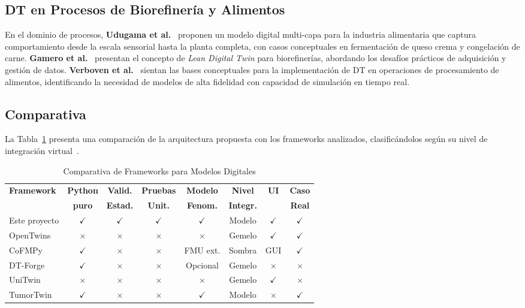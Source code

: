 \documentclass[10pt,letterpaper,twocolumn]{article}
\begin{document}
\subsection{DT en Procesos de Biorefinería y Alimentos}

En el dominio de procesos, \textbf{Udugama et al.}~\cite{udugama2023digital} proponen un modelo digital multi-capa para la industria alimentaria que captura comportamiento desde la escala sensorial hasta la planta completa, con casos conceptuales en fermentación de queso crema y congelación de carne. \textbf{Gamero et al.}~\cite{gamero2024data} presentan el concepto de \textit{Lean Digital Twin} para biorefinerías, abordando los desafíos prácticos de adquisición y gestión de datos. \textbf{Verboven et al.}~\cite{verboven2020digital} sientan las bases conceptuales para la implementación de DT en operaciones de procesamiento de alimentos, identificando la necesidad de modelos de alta fidelidad con capacidad de simulación en tiempo real.

\subsection{Comparativa}

La Tabla~\ref{tab:comparativa} presenta una comparación de la arquitectura propuesta con los frameworks analizados, clasificándolos según su nivel de integraci\'on virtual~\cite{kritzinger2018digital}.

\begin{table}[t]
\centering
\caption{Comparativa de Frameworks para Modelos Digitales}
\label{tab:comparativa}
\footnotesize
\begin{tabular}{lccccccc}
\toprule
\textbf{Framework} & \textbf{Python} & \textbf{Valid.} & \textbf{Pruebas} & \textbf{Modelo} & \textbf{Nivel} & \textbf{UI} & \textbf{Caso} \\
 & \textbf{puro} & \textbf{Estad.} & \textbf{Unit.} & \textbf{Fenom.} & \textbf{Integr.} & & \textbf{Real} \\
\midrule
Este proyecto & $\checkmark$ & $\checkmark$ & $\checkmark$ & $\checkmark$ & Modelo & $\checkmark$ & $\checkmark$ \\
OpenTwins~\cite{robles2023opentwins} & $\times$ & $\times$ & $\times$ & $\times$ & Gemelo & $\checkmark$ & $\checkmark$ \\
CoFMPy~\cite{friedrich2025cofmupy} & $\checkmark$ & $\times$ & $\times$ & FMU ext. & Sombra & GUI & $\checkmark$ \\
DT-Forge~\cite{dtforge2025} & $\checkmark$ & $\times$ & $\times$ & Opcional & Gemelo & $\times$ & $\times$ \\
UniTwin~\cite{haussermann2024unitwin} & $\times$ & $\times$ & $\times$ & $\times$ & Gemelo & $\checkmark$ & $\times$ \\
TumorTwin~\cite{tumortwin2025} & $\checkmark$ & $\times$ & $\times$ & $\checkmark$ & Modelo & $\times$ & $\checkmark$ \\
\bottomrule
\end{tabular}
\end{table}
\end{document}
